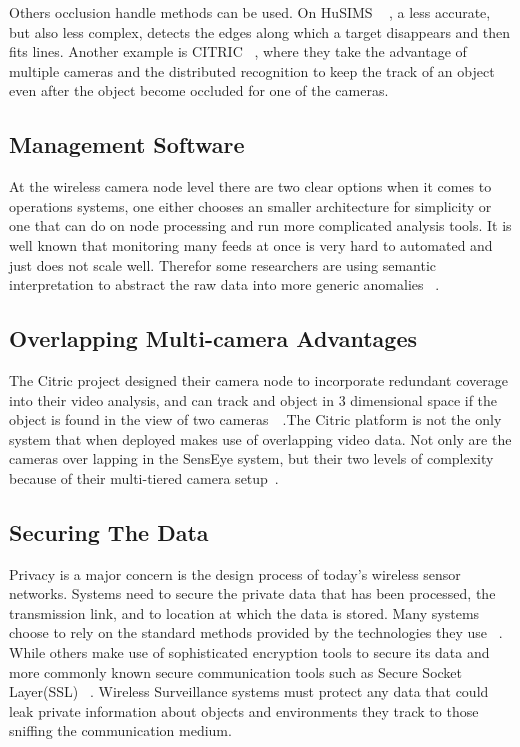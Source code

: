 \documentclass[journal,transmag]{IEEEtran}
\begin{document}
Others occlusion handle methods can be used. On HuSIMS  ~\cite{HuSIMS} , a less accurate, but also less complex, detects the edges along which a target disappears and then fits
lines. Another example is CITRIC ~\cite{Citric}, where they take the advantage of multiple cameras and the distributed recognition to keep the track of an object even after 
the object become occluded for one of the cameras.


\subsection{Management Software}
At the wireless camera  node level there are two clear options when it comes to operations systems, one either chooses an smaller architecture for 
simplicity or one that can do on node processing and run more complicated analysis tools.
It is well known that monitoring many feeds at once is very hard to automated and just does not scale well. Therefor some researchers are using semantic
interpretation to abstract the raw data into more generic anomalies ~\cite{HuSIMS}. 

\subsection{Overlapping Multi-camera Advantages}
The Citric project designed their camera node to incorporate redundant coverage into their video analysis, and can track and object in 3 dimensional space if the object
is found in the view of two cameras~\cite{OmniEye}~\cite{DTNSmartCamera}.The Citric platform is not the only system that when deployed makes use of overlapping video data. 
Not only are the cameras over lapping in the SensEye system, but their two levels of complexity because of their multi-tiered camera setup~\cite{SensEye}.

\subsection{Securing The Data}
Privacy is a major concern is the design process of today's wireless sensor networks. Systems need to secure the private data that has been processed, the
transmission link, and to location at which the data is stored. Many systems choose to rely on the standard methods provided by the technologies they use
~\cite{HuSIMS}. While others make use of sophisticated encryption tools to secure its data and more commonly known secure communication tools such as Secure
Socket Layer(SSL) ~\cite{OmniEye}. Wireless Surveillance systems must protect any data that could leak private information about objects and environments they track to those
sniffing the communication medium. 
\end{document}
